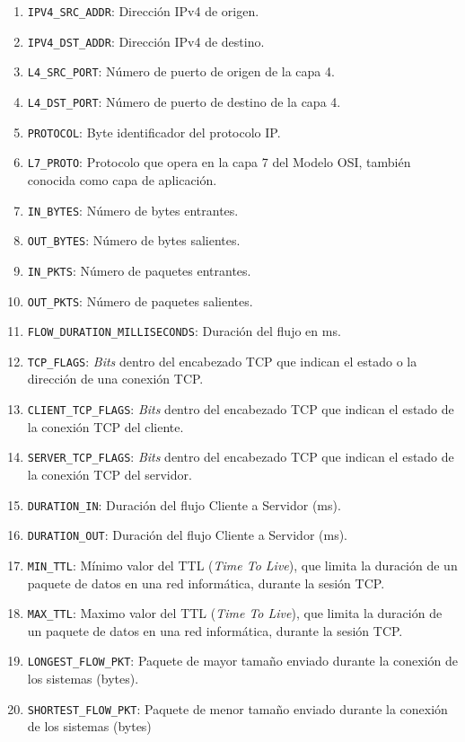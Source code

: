 \begin{enumerate}
    \item \texttt{IPV4\_SRC\_ADDR}: Dirección IPv4 de origen.
    \item \texttt{IPV4\_DST\_ADDR}: Dirección IPv4 de destino.
    \item \texttt{L4\_SRC\_PORT}: Número de puerto de origen de la capa 4.
    \item \texttt{L4\_DST\_PORT}: Número de puerto de destino de la capa 4.
    \item \texttt{PROTOCOL}: Byte identificador del protocolo IP.
    \item \texttt{L7\_PROTO}: Protocolo que opera en la capa 7 del Modelo OSI, también conocida como capa de aplicación.
    \item \texttt{IN\_BYTES}: Número de bytes entrantes.
    \item \texttt{OUT\_BYTES}: Número de bytes salientes.
    \item \texttt{IN\_PKTS}: Número de paquetes entrantes.
    \item \texttt{OUT\_PKTS}: Número de paquetes salientes.
    \item \texttt{FLOW\_DURATION\_MILLISECONDS}: Duración del flujo en ms.
    \item \texttt{TCP\_FLAGS}: \textit{Bits} dentro del encabezado TCP que indican el estado o la dirección de una conexión TCP.
    \item \texttt{CLIENT\_TCP\_FLAGS}: \textit{Bits} dentro del encabezado TCP que indican el estado de la conexión TCP del cliente.
    \item \texttt{SERVER\_TCP\_FLAGS}: \textit{Bits} dentro del encabezado TCP que indican el estado de la conexión TCP del servidor.
    \item \texttt{DURATION\_IN}: Duración del flujo Cliente a Servidor (ms).
    \item \texttt{DURATION\_OUT}: Duración del flujo Cliente a Servidor (ms).
    \item \texttt{MIN\_TTL}: Mínimo valor del TTL (\textit{Time To Live}), que limita la duración de un paquete de datos en una red informática, durante la sesión TCP.
    \item \texttt{MAX\_TTL}: Maximo valor del TTL (\textit{Time To Live}), que limita la duración de un paquete de datos en una red informática, durante la sesión TCP.
    \item \texttt{LONGEST\_FLOW\_PKT}: Paquete de mayor tamaño enviado durante la conexión de los sistemas (bytes).
    \item \texttt{SHORTEST\_FLOW\_PKT}: Paquete de menor tamaño enviado durante la conexión de los sistemas (bytes)

\end{enumerate}
